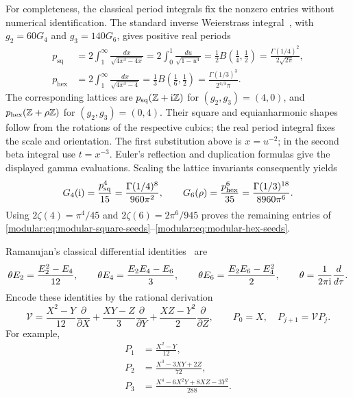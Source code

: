 For completeness, the classical period integrals fix the nonzero
entries without numerical identification. The standard inverse
Weierstrass integral~\cite{hstruct:DLMF}, with
\(g_2=60G_4\) and \(g_3=140G_6\), gives positive real periods
\begin{align*}
p_{\mathrm{sq}}
&=2\int_1^\infty\frac{dx}{\sqrt{4x^3-4x}}
 =2\int_0^1\frac{du}{\sqrt{1-u^4}}
 =\frac12 B\!\left(\frac14,\frac12\right)
 =\frac{\Gamma(1/4)^2}{2\sqrt{2\pi}},\\
p_{\mathrm{hex}}
&=2\int_1^\infty\frac{dx}{\sqrt{4x^3-4}}
 =\frac13 B\!\left(\frac16,\frac12\right)
 =\frac{\Gamma(1/3)^3}{2^{4/3}\pi}.
\end{align*}
The corresponding lattices are
\(p_{\mathrm{sq}}(\mathbb{Z}+\mathrm{i}\mathbb{Z})\) for \((g_2,g_3)=(4,0)\), and
\(p_{\mathrm{hex}}(\mathbb{Z}+\rho\mathbb{Z})\) for \((g_2,g_3)=(0,4)\).
Their square and equianharmonic shapes follow from the rotations of
the respective cubics; the real period integral fixes the scale and
orientation. The first substitution above is \(x=u^{-2}\); in the
second beta integral use \(t=x^{-3}\). Euler's reflection and
duplication formulas give the displayed gamma evaluations.
Scaling the lattice invariants consequently yields
\[
G_4(\mathrm{i})=\frac{p_{\mathrm{sq}}^4}{15}
 =\frac{\Gamma(1/4)^8}{960\pi^2},\qquad
G_6(\rho)=\frac{p_{\mathrm{hex}}^6}{35}
 =\frac{\Gamma(1/3)^{18}}{8960\pi^6}.
\]
Using \(2\zeta(4)=\pi^4/45\) and
\(2\zeta(6)=2\pi^6/945\) proves the remaining entries of
\eqref{modular:eq:modular-square-seeds}--\eqref{modular:eq:modular-hex-seeds}.

Ramanujan's classical differential identities~\cite{modular:Ramanujan} are
\begin{equation}
\theta E_2=\frac{E_2^2-E_4}{12},\qquad
\theta E_4=\frac{E_2E_4-E_6}{3},\qquad
\theta E_6=\frac{E_2E_6-E_4^2}{2},\qquad
\theta=\frac1{2\pi\mathrm{i}}\frac{d}{d\tau}.
\label{modular:eq:modular-Ramanujan-system}
\end{equation}
Encode these identities by the rational derivation
\begin{equation}
\mathcal V
=\frac{X^2-Y}{12}\frac{\partial}{\partial X}
 +\frac{XY-Z}{3}\frac{\partial}{\partial Y}
 +\frac{XZ-Y^2}{2}\frac{\partial}{\partial Z},
\qquad P_0=X,\quad P_{j+1}=\mathcal V P_j.
\label{modular:eq:modular-P-recurrence}
\end{equation}
For example,
\begin{align*}
P_1&=\frac{X^2-Y}{12},\\
P_2&=\frac{X^3-3XY+2Z}{72},\\
P_3&=\frac{X^4-6X^2Y+8XZ-3Y^2}{288}.
\end{align*}

